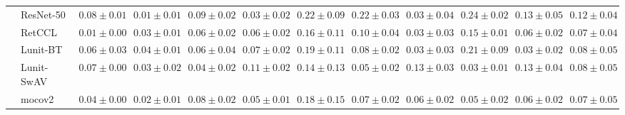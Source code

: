 \begin{tabular}{ll|cccc|c|cccc|c}
 & ResNet-50 & $0.08 \pm 0.01$ & $\mathbf{0.01 \pm 0.01}$ & $0.09 \pm 0.02$ & $0.03 \pm 0.02$ & $0.22 \pm 0.09$ & $0.22 \pm 0.03$ & $0.03 \pm 0.04$ & $0.24 \pm 0.02$ & $0.13 \pm 0.05$ & $0.12 \pm 0.04$ \\
 & RetCCL & $0.01 \pm 0.00$ & $0.03 \pm 0.01$ & $0.06 \pm 0.02$ & $0.06 \pm 0.02$ & $0.16 \pm 0.11$ & $0.10 \pm 0.04$ & $0.03 \pm 0.03$ & $0.15 \pm 0.01$ & $0.06 \pm 0.02$ & $0.07 \pm 0.04$ \\
 & Lunit-BT & $0.06 \pm 0.03$ & $0.04 \pm 0.01$ & $0.06 \pm 0.04$ & $0.07 \pm 0.02$ & $0.19 \pm 0.11$ & $0.08 \pm 0.02$ & $0.03 \pm 0.03$ & $0.21 \pm 0.09$ & $0.03 \pm 0.02$ & $0.08 \pm 0.05$ \\
 & Lunit-SwAV & $0.07 \pm 0.00$ & $0.03 \pm 0.02$ & $0.04 \pm 0.02$ & $0.11 \pm 0.02$ & $0.14 \pm 0.13$ & $0.05 \pm 0.02$ & $0.13 \pm 0.03$ & $0.03 \pm 0.01$ & $0.13 \pm 0.04$ & $0.08 \pm 0.05$ \\
 & mocov2 & $0.04 \pm 0.00$ & $0.02 \pm 0.01$ & $0.08 \pm 0.02$ & $0.05 \pm 0.01$ & $0.18 \pm 0.15$ & $0.07 \pm 0.02$ & $0.06 \pm 0.02$ & $0.05 \pm 0.02$ & $0.06 \pm 0.02$ & $0.07 \pm 0.05$ \\
\cline{1-12}
\bottomrule
\end{tabular}
